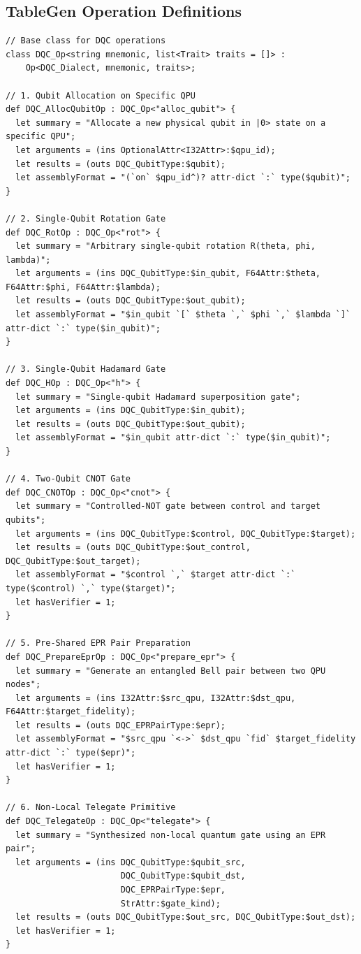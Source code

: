 \subsection{TableGen Operation Definitions}
\begin{lstlisting}[language=MLIR, caption={Core TableGen Operations in DQC (DQCOps.td)}]
// Base class for DQC operations
class DQC_Op<string mnemonic, list<Trait> traits = []> :
    Op<DQC_Dialect, mnemonic, traits>;

// 1. Qubit Allocation on Specific QPU
def DQC_AllocQubitOp : DQC_Op<"alloc_qubit"> {
  let summary = "Allocate a new physical qubit in |0> state on a specific QPU";
  let arguments = (ins OptionalAttr<I32Attr>:$qpu_id);
  let results = (outs DQC_QubitType:$qubit);
  let assemblyFormat = "(`on` $qpu_id^)? attr-dict `:` type($qubit)";
}

// 2. Single-Qubit Rotation Gate
def DQC_RotOp : DQC_Op<"rot"> {
  let summary = "Arbitrary single-qubit rotation R(theta, phi, lambda)";
  let arguments = (ins DQC_QubitType:$in_qubit, F64Attr:$theta, F64Attr:$phi, F64Attr:$lambda);
  let results = (outs DQC_QubitType:$out_qubit);
  let assemblyFormat = "$in_qubit `[` $theta `,` $phi `,` $lambda `]` attr-dict `:` type($in_qubit)";
}

// 3. Single-Qubit Hadamard Gate
def DQC_HOp : DQC_Op<"h"> {
  let summary = "Single-qubit Hadamard superposition gate";
  let arguments = (ins DQC_QubitType:$in_qubit);
  let results = (outs DQC_QubitType:$out_qubit);
  let assemblyFormat = "$in_qubit attr-dict `:` type($in_qubit)";
}

// 4. Two-Qubit CNOT Gate
def DQC_CNOTOp : DQC_Op<"cnot"> {
  let summary = "Controlled-NOT gate between control and target qubits";
  let arguments = (ins DQC_QubitType:$control, DQC_QubitType:$target);
  let results = (outs DQC_QubitType:$out_control, DQC_QubitType:$out_target);
  let assemblyFormat = "$control `,` $target attr-dict `:` type($control) `,` type($target)";
  let hasVerifier = 1;
}

// 5. Pre-Shared EPR Pair Preparation
def DQC_PrepareEprOp : DQC_Op<"prepare_epr"> {
  let summary = "Generate an entangled Bell pair between two QPU nodes";
  let arguments = (ins I32Attr:$src_qpu, I32Attr:$dst_qpu, F64Attr:$target_fidelity);
  let results = (outs DQC_EPRPairType:$epr);
  let assemblyFormat = "$src_qpu `<->` $dst_qpu `fid` $target_fidelity attr-dict `:` type($epr)";
  let hasVerifier = 1;
}

// 6. Non-Local Telegate Primitive
def DQC_TelegateOp : DQC_Op<"telegate"> {
  let summary = "Synthesized non-local quantum gate using an EPR pair";
  let arguments = (ins DQC_QubitType:$qubit_src, 
                       DQC_QubitType:$qubit_dst, 
                       DQC_EPRPairType:$epr,
                       StrAttr:$gate_kind);
  let results = (outs DQC_QubitType:$out_src, DQC_QubitType:$out_dst);
  let hasVerifier = 1;
}


\end{lstlisting}
